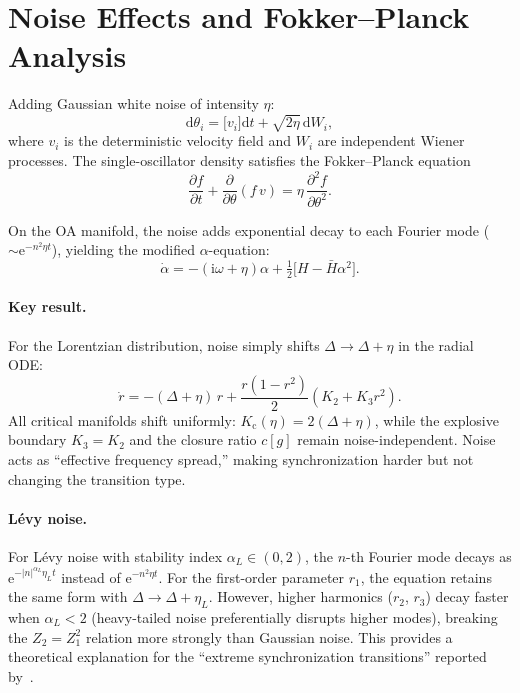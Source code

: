 \documentclass{article}
\newcommand{\dd}{\mathrm{d}}
\newcommand{\ii}{\mathrm{i}}
\newcommand{\ee}{\mathrm{e}}
\newcommand{\Kc}{K_{\mathrm{c}}}
\begin{document}
\section{Noise Effects and Fokker--Planck Analysis}
\label{app:fokker-planck}

Adding Gaussian white noise of intensity $\eta$:
\begin{equation}
  \dd\theta_i = \bigl[v_i\bigr]\dd t + \sqrt{2\eta}\,\dd W_i,
\end{equation}
where $v_i$ is the deterministic velocity field and $W_i$ are independent
Wiener processes.  The single-oscillator density satisfies the Fokker--Planck
equation
\begin{equation}
  \frac{\partial f}{\partial t}
  + \frac{\partial}{\partial\theta}(f\,v)
  = \eta\,\frac{\partial^2 f}{\partial\theta^2}.
\end{equation}

On the OA manifold, the noise adds exponential decay to each Fourier mode
($\sim\ee^{-n^2\eta t}$), yielding the modified $\alpha$-equation:
\begin{equation}
  \dot{\alpha} = -(\ii\omega + \eta)\alpha
  + \tfrac{1}{2}\bigl[H - \bar{H}\alpha^2\bigr].
\end{equation}

\paragraph{Key result.} For the Lorentzian distribution, noise simply shifts
$\Delta\to\Delta+\eta$ in the radial ODE:
\begin{equation}
  \boxed{
  \dot{r} = -(\Delta+\eta)\,r + \frac{r(1-r^2)}{2}(K_2 + K_3 r^2).
  }
\end{equation}
All critical manifolds shift uniformly: $\Kc(\eta) = 2(\Delta+\eta)$,
while the explosive boundary $K_3=K_2$ and the closure ratio $c[g]$
remain noise-independent.  Noise acts as ``effective frequency spread,''
making synchronization harder but not changing the transition type.

\paragraph{L\'evy noise.} For L\'evy noise with stability index
$\alpha_L\in(0,2)$, the $n$-th Fourier mode decays as
$\ee^{-|n|^{\alpha_L}\eta_L t}$ instead of $\ee^{-n^2\eta t}$.
For the first-order parameter $r_1$, the equation retains the same form
with $\Delta\to\Delta+\eta_L$.  However, higher harmonics ($r_2$, $r_3$)
decay faster when $\alpha_L<2$ (heavy-tailed noise preferentially disrupts
higher modes), breaking the $Z_2=Z_1^2$ relation more strongly than Gaussian
noise.  This provides a theoretical explanation for the ``extreme
synchronization transitions'' reported by~\citet{Lee2025}.
\end{document}

